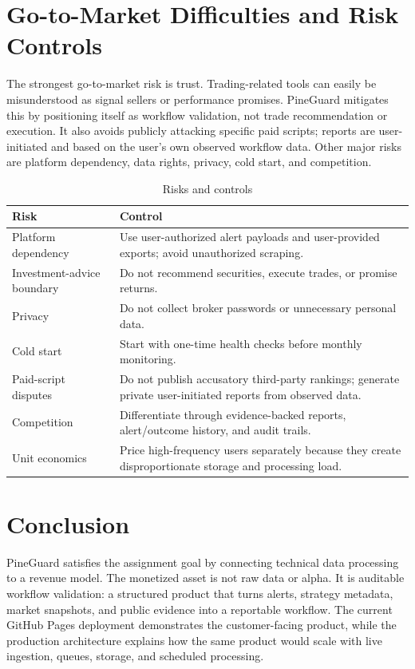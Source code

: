 \documentclass[11pt,a4paper]{article}
\begin{document}
\section{Go-to-Market Difficulties and Risk Controls}

The strongest go-to-market risk is trust. Trading-related tools can easily be misunderstood as signal sellers or performance promises. PineGuard mitigates this by positioning itself as workflow validation, not trade recommendation or execution. It also avoids publicly attacking specific paid scripts; reports are user-initiated and based on the user's own observed workflow data. Other major risks are platform dependency, data rights, privacy, cold start, and competition.

\begin{table}[H]
\centering
\caption{Risks and controls}
\small
\begin{tabularx}{\textwidth}{>{\raggedright\arraybackslash}p{3.0cm}X}
\toprule
\textbf{Risk} & \textbf{Control} \\
\midrule
Platform dependency & Use user-authorized alert payloads and user-provided exports; avoid unauthorized scraping. \\
Investment-advice boundary & Do not recommend securities, execute trades, or promise returns. \\
Privacy & Do not collect broker passwords or unnecessary personal data. \\
Cold start & Start with one-time health checks before monthly monitoring. \\
Paid-script disputes & Do not publish accusatory third-party rankings; generate private user-initiated reports from observed data. \\
Competition & Differentiate through evidence-backed reports, alert/outcome history, and audit trails. \\
Unit economics & Price high-frequency users separately because they create disproportionate storage and processing load. \\
\bottomrule
\end{tabularx}
\end{table}

\section{Conclusion}

PineGuard satisfies the assignment goal by connecting technical data processing to a revenue model. The monetized asset is not raw data or alpha. It is auditable workflow validation: a structured product that turns alerts, strategy metadata, market snapshots, and public evidence into a reportable workflow. The current GitHub Pages deployment demonstrates the customer-facing product, while the production architecture explains how the same product would scale with live ingestion, queues, storage, and scheduled processing.
\end{document}
